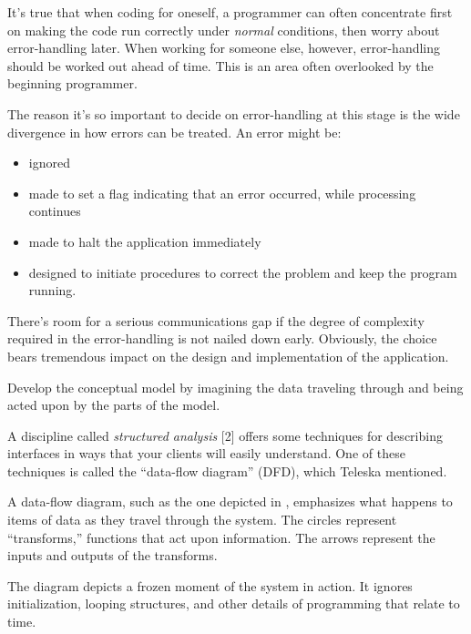 \noindent It's true that when coding for oneself, a programmer can
often concentrate first on making the code run correctly under
\emph{normal} conditions, then worry about error-handling later. When
working for someone else, however, error-handling should be worked out
ahead of time. This is an area often overlooked by the beginning
programmer.

The reason it's so important to decide on error-handling at this stage
is the wide divergence in how errors can be treated. An error might be:

\begin{itemize}
\item ignored
\item made to set a flag indicating that an error occurred, while processing
continues
\item made to halt the application immediately
\item designed to initiate procedures to correct the problem and keep the
program running.
\end{itemize}


There's room for a serious communications gap if the degree of
complexity required in the error-handling is not nailed down early. Obviously, the
choice bears tremendous impact on the design and implementation of the
application.

\begin{tip}
Develop the conceptual model by imagining the data traveling through and
being acted upon by the parts of the model.
\end{tip}
A discipline called \emph{structured analysis} {[}2{]} offers some
techniques for describing interfaces in ways that your clients will
easily understand.  One of these techniques is called the ``data-flow
diagram'' (DFD), which Teleska mentioned.


A data-flow diagram, such as the one depicted in ,
emphasizes what happens to items of data as they travel through the
system.  The circles represent ``transforms,'' functions that act upon
information.  The arrows represent the inputs and outputs of the
transforms.

The diagram depicts a frozen moment of the system in action. It
ignores initialization, looping structures, and other details of
programming that relate to time.

